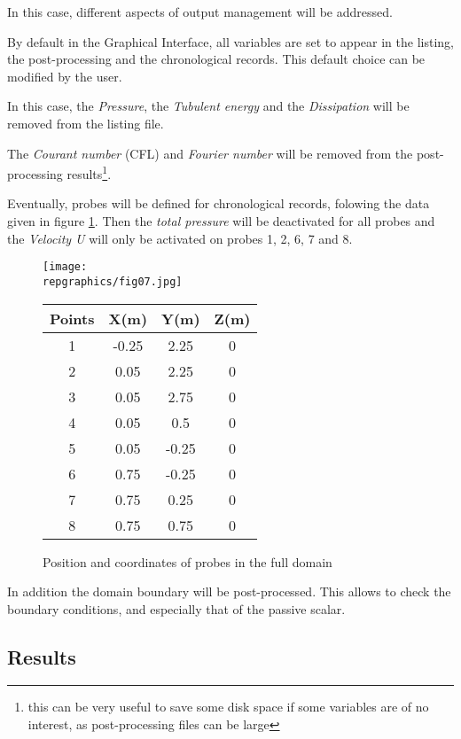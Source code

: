 In this case, different aspects of output management will be addressed.

By default in the Graphical Interface, all variables are set to appear in the
listing, the post-processing and the chronological records. This default choice
can be modified by the user.

In this case, the {\itshape Pressure}, the {\itshape Tubulent energy} and the
{\itshape Dissipation} will be removed from the listing file.

The {\itshape Courant number} (CFL) and {\itshape Fourier number} will be
removed from the 
post-processing results\footnote{this can be very useful to save some disk space
if some variables are of no interest, as post-processing files can be large}.

Eventually, probes will be defined for chronological records, folowing the data
given in figure \ref{figante25}. Then the {\itshape total pressure} will be
deactivated for all probes and the {\itshape Velocity U} will only be activated
on probes  1, 2, 6, 7 and 8.

\begin{figure}[htp]
\parbox{8cm}{%
\centerline{\texttt{[image: \\repgraphics/fig07.jpg]}}}
\parbox{7cm}{%
\begin{center}
\begin{tabular}{|c|c|c|c|}
\hline
Points & X(m) & Y(m) & Z(m)\\
\hline
1 & -0.25 & 2.25 & 0 \\
\hline
2 & 0.05 & 2.25 & 0 \\
\hline
3 & 0.05 & 2.75 & 0 \\
\hline
4 & 0.05 & 0.5 & 0 \\
\hline
5 & 0.05 & -0.25 & 0 \\
\hline
6 & 0.75 & -0.25 & 0 \\
\hline
7 & 0.75 & 0.25 & 0 \\
\hline
8 & 0.75 & 0.75 & 0 \\
\hline
\end{tabular}
\end{center}
}
\caption{Position and coordinates of probes in the full domain}
\label{figante25}
\end{figure}

In addition the domain boundary will be post-processed. This allows to check the
boundary conditions, and especially that of the passive scalar. 


	\subsection{Results}

